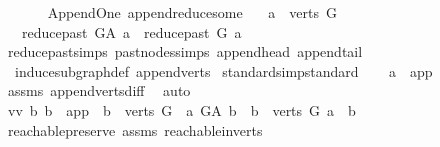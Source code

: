 \begin{isabellebody}
\ \ \ \ \isanewline
%
\endisadelimproof
\isanewline
{}\isamarkupfalse%
\ {\isacharparenleft}{\kern0pt}\ Append{\isacharunderscore}{\kern0pt}One{\isacharparenright}{\kern0pt}\ append{\isacharunderscore}{\kern0pt}reduce{\isacharunderscore}{\kern0pt}some{\isacharcolon}{\kern0pt}\isanewline
\ \ \ {\isachardoublequoteopen}a\ {\isasymin}\ verts\ G{\isachardoublequoteclose}\isanewline
\ \ \ {\isachardoublequoteopen}reduce{\isacharunderscore}{\kern0pt}past\ G{\isacharunderscore}{\kern0pt}A\ a\ {\isacharequal}{\kern0pt}\ reduce{\isacharunderscore}{\kern0pt}past\ G\ a{\isachardoublequoteclose}\isanewline
%
\isadelimproof
\ \ %
\endisadelimproof
%
\isatagproof
{}\isamarkupfalse%
\ reduce{\isacharunderscore}{\kern0pt}past{\isachardot}{\kern0pt}simps\ past{\isacharunderscore}{\kern0pt}nodes{\isachardot}{\kern0pt}simps\ append{\isacharunderscore}{\kern0pt}head\ append{\isacharunderscore}{\kern0pt}tail\ \isanewline
\ \ induce{\isacharunderscore}{\kern0pt}subgraph{\isacharunderscore}{\kern0pt}def\ append{\isacharunderscore}{\kern0pt}verts\ \isanewline
{}\isamarkupfalse%
{\isacharparenleft}{\kern0pt}standard{\isacharcomma}{\kern0pt}simp{\isacharcomma}{\kern0pt}standard{\isacharparenright}{\kern0pt}\isanewline
\ \ \isamarkupfalse%
\ {\isachardoublequoteopen}a\ {\isasymnoteq}\ app{\isachardoublequoteclose}\ \isamarkupfalse%
\ assms{\isacharparenleft}{\kern0pt}{}{\isacharparenright}{\kern0pt}\ append{\isacharunderscore}{\kern0pt}verts{\isacharunderscore}{\kern0pt}diff\ \isamarkupfalse%
\ auto\isanewline
\ \ \isamarkupfalse%
\ \isamarkupfalse%
\ vv{\isacharcolon}{\kern0pt}\ {\isachardoublequoteopen}{\isacharbraceleft}{\kern0pt}b{\isachardot}{\kern0pt}\ {\isacharparenleft}{\kern0pt}b\ {\isacharequal}{\kern0pt}\ app\ {\isasymor}\ b\ {\isasymin}\ verts\ G{\isacharparenright}{\kern0pt}\ {\isasymand}\ a\ {\isasymrightarrow}\isactrlsup {\isacharplus}{\kern0pt}\isactrlbsub G{\isacharunderscore}{\kern0pt}A\isactrlesub \ b{\isacharbraceright}{\kern0pt}\ {\isacharequal}{\kern0pt}\ {\isacharbraceleft}{\kern0pt}b\ {\isasymin}\ verts\ G{\isachardot}{\kern0pt}\ a\ {\isasymrightarrow}\isactrlsup {\isacharplus}{\kern0pt}\ b{\isacharbraceright}{\kern0pt}{\isachardoublequoteclose}\ \isanewline
\ \ \ \ \isamarkupfalse%
\ reachable{}{\isacharunderscore}{\kern0pt}preserve\ assms\ reachable{}{\isacharunderscore}{\kern0pt}in{\isacharunderscore}{\kern0pt}verts{\isacharparenleft}{\kern0pt}{}{\isacharparenright}{\kern0pt}\ \isamarkupfalse%

\end{isabellebody}
